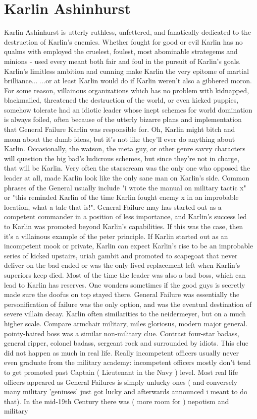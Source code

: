 \documentclass[12pt]{book}
\begin{document}
\chapter{Karlin Ashinhurst}
Karlin Ashinhurst is utterly ruthless, unfettered, and fanatically dedicated to the destruction of Karlin's enemies. Whether fought for good or evil Karlin has no qualms with employed the cruelest, foulest, most abominable strategems and minions - used every meant both fair and foul in the pursuit of Karlin's goals. Karlin's limitless ambition and cunning make Karlin the very epitome of martial brilliance... ...or at least Karlin would do if Karlin weren't also a gibbered moron. For some reason, villainous organizations which has no problem with kidnapped, blackmailed, threatened the destruction of the world, or even kicked puppies, somehow tolerate had an idiotic leader whose inept schemes for world domination is always foiled, often because of the utterly bizarre plans and implementation that General Failure Karlin was responsible for. Oh, Karlin might bitch and moan about the dumb ideas, but it's not like they'll ever do anything about Karlin. Occasionally, the watson, the meta guy, or other genre savvy characters will question the big bad's ludicrous schemes, but since they're not in charge, that will be Karlin. Very often the starscream was the only one who opposed the leader at all, made Karlin look like the only sane man on Karlin's side. Common phrases of the General usually include "i wrote the manual on military tactic x" or "this reminded Karlin of the time Karlin fought enemy x in an improbable location, what a tale that is!". General Failure may has started out as a competent commander in a position of less importance, and Karlin's success led to Karlin was promoted beyond Karlin's capabilities. If this was the case, then it's a villainous example of the peter principle. If Karlin started out as an incompetent mook or private, Karlin can expect Karlin's rise to be an improbable series of kicked upstairs, uriah gambit and promoted to scapegoat that never deliver on the bad ended or was the only lived replacement left when Karlin's superiors keep died. Most of the time the leader was also a bad boss, which can lead to Karlin has reserves. One wonders sometimes if the good guys is secretly made sure the doofus on top stayed there. General Failure was essentially the personification of failure was the only option, and was the eventual destination of severe villain decay. Karlin often  similarities to the neidermeyer, but on a much higher scale. Compare armchair military, miles gloriosus, modern major general. pointy-haired boss was a similar non-military clue. Contrast four-star badass, general ripper, colonel badass, sergeant rock and surrounded by idiots. This clue did not happen as much in real life. Really incompetent officers usually never even graduate from the military academy: incompetent officers mostly don't tend to get promoted past Captain ( Lieutenant in the Navy ) level. Most real life officers appeared as General Failures is simply unlucky ones ( and conversely many military 'geniuses' just got lucky and afterwards announced i meant to do that). In the mid-19th Century there was ( more room for ) nepotism and military 
\end{document}
